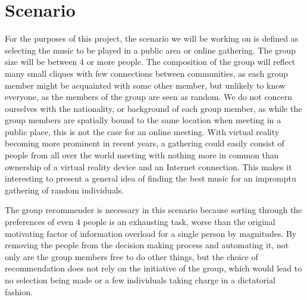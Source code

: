 \section{Scenario}

For the purposes of this project, the scenario we will be working on is defined as selecting the music to be played in a public area or online gathering. The group size will be between 4 or more people. The composition of the group will reflect many small cliques with few connections between communities, as each group member might be acquainted with some other member, but unlikely to know everyone, as the members of the group are seen as random. We do not concern ourselves with the nationality, or background of each group member, as while the group members are spatially bound to the same location when meeting in a public place, this is not the case for an online meeting. With virtual reality becoming more prominent in recent years, a gathering could easily consist of people from all over the world meeting with nothing more in common than ownership of a virtual reality device and an Internet connection. This makes it interesting to present a general idea of finding the best music for an impromptu gathering of random individuals. %

The group recommender is necessary in this scenario because sorting through the preferences of even 4 people is an exhausting task, worse than the original motivating factor of information overload for a single person by magnitudes. By removing the people from the decision making process and automating it, not only are the group members free to do other things, but the choice of recommendation does not rely on the initiative of the group, which would lead to no selection being made or a few individuals taking charge in a dictatorial fashion.

